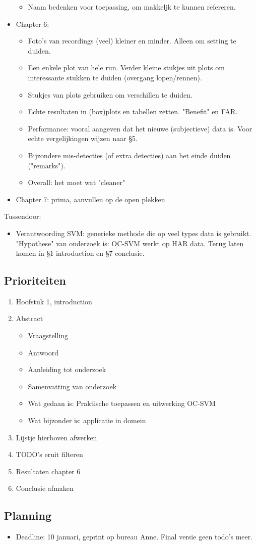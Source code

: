 \begin{itemize}
\begin{itemize}
    \item Naam bedenken voor toepassing, om makkeljk te kunnen refereren.
  \end{itemize}
  \item Chapter 6:
  \begin{itemize}
    \item Foto's van recordings (veel) kleiner en minder. Alleen om setting te duiden.
    \item Een enkele plot van hele run. Verder kleine stukjes uit plots om interessante stukken te duiden (overgang lopen/rennen).
    \item Stukjes van plots gebruiken om verschillen te duiden.
    \item Echte resultaten in (box)plots en tabellen zetten. "Benefit" en FAR.
    \item Performance: vooral aangeven dat het nieuwe (subjectieve) data is. Voor echte vergelijkingen wijzen naar §5.
    \item Bijzondere mis-detecties (of extra detecties) aan het einde duiden ("remarks").
    \item Overall: het moet wat "cleaner"
  \end{itemize}
  \item Chapter 7: prima, aanvullen op de open plekken
\end{itemize}

Tussendoor:
\begin{itemize}
  \item Verantwoording SVM: generieke methode die op veel types data is gebruikt. "Hypothese" van onderzoek is: OC-SVM werkt op HAR data. Terug laten komen in §1 introduction en §7 conclusie.
\end{itemize}

\subsection{Prioriteiten}
\begin{enumerate}
  \item Hoofstuk 1, introduction
  \item Abstract
  \begin{itemize}
    \item Vraagstelling
    \item Antwoord
    \item Aanleiding tot onderzoek
    \item Samenvatting van onderzoek
    \item Wat gedaan is: Praktische toepassen en uitwerking OC-SVM
    \item Wat bijzonder is: applicatie in domein
  \end{itemize}
  \item Lijstje hierboven afwerken
  \item TODO's eruit filteren
  \item Resultaten chapter 6
  \item Conclusie afmaken
\end{enumerate}

\subsection{Planning}
\begin{itemize}
  \item Deadline: 10 januari, geprint op bureau Anne. Final versie geen todo's meer.
\end{itemize}